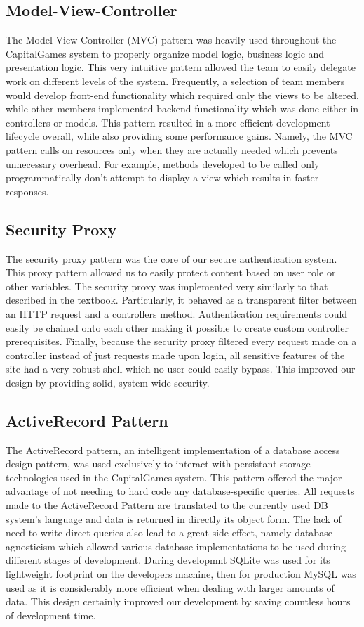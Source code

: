 \subsection{Model-View-Controller}
The Model-View-Controller (MVC) pattern was heavily used throughout the CapitalGames system to properly organize model logic, business logic and presentation logic. This very intuitive pattern allowed the team to easily delegate work on different levels of the system. Frequently, a selection of team members would develop front-end functionality which required only the views to be altered, while other members implemented backend functionality which was done either in controllers or models. This pattern resulted in a more efficient development lifecycle overall, while also providing some performance gains. Namely, the MVC pattern calls on resources only when they are actually needed which prevents unnecessary overhead. For example, methods developed to be called only programmatically don't attempt to display a view which results in faster responses.
\subsection{Security Proxy}
The security proxy pattern was the core of our secure authentication system. This proxy pattern allowed us to easily protect content based on user role or other variables. The security proxy was implemented very similarly to that described in the textbook. Particularly, it behaved as a transparent filter between an HTTP request and a controllers method. Authentication requirements could easily be chained onto each other making it possible to create custom controller prerequisites. Finally, because the security proxy filtered every request made on a controller instead of just requests made upon login, all sensitive features of the site had a very robust shell which no user could easily bypass. This improved our design by providing solid, system-wide security.
\subsection{ActiveRecord Pattern}
The ActiveRecord pattern, an intelligent implementation of a database access design pattern, was used exclusively to interact with persistant storage technologies used in the CapitalGames system. This pattern offered the major advantage of not needing to hard code any database-specific queries. All requests made to the ActiveRecord Pattern are translated to the currently used DB system's language and data is returned in directly its object form. The lack of need to write direct queries also lead to a great side effect, namely database agnosticism which allowed various database implementations to be used during different stages of development. During developmnt SQLite was used for its lightweight footprint on the developers machine, then for production MySQL was used as it is considerably more efficient when dealing with larger amounts of data. This design certainly improved our development by saving countless hours of development time.
